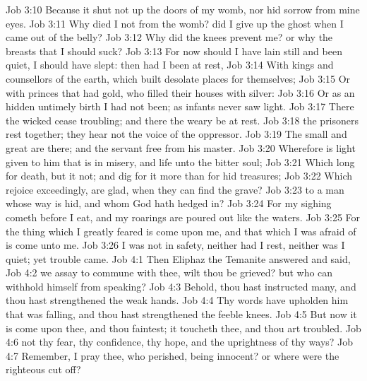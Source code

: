 \vs Job 3:10 Because it shut not up the doors of my  womb, nor hid sorrow from mine eyes.
\vs Job 3:11 Why died I not from the womb?  did I  give up the ghost when I came out of the belly?
\vs Job 3:12 Why did the knees prevent me? or why the breasts that I should suck?
\vs Job 3:13 For now should I have lain still and been quiet, I should have slept: then had I been at rest,
\vs Job 3:14 With kings and counsellors of the earth, which built desolate places for themselves;
\vs Job 3:15 Or with princes that had gold, who filled their houses with silver:
\vs Job 3:16 Or as an hidden untimely birth I had not been; as infants  never saw light.
\vs Job 3:17 There the wicked cease  troubling; and there the weary be at rest.
\vs Job 3:18  the prisoners rest together; they hear not the voice of the oppressor.
\vs Job 3:19 The small and great are there; and the servant  free from his master.
\vs Job 3:20 Wherefore is light given to him that is in misery, and life unto the bitter  soul;
\vs Job 3:21 Which long for death, but it  not; and dig for it more than for hid treasures;
\vs Job 3:22 Which rejoice exceedingly,  are glad, when they can find the grave?
\vs Job 3:23  to a man whose way is hid, and whom God hath hedged in?
\vs Job 3:24 For my sighing cometh before I eat, and my roarings are poured out like the waters.
\vs Job 3:25 For the thing which I greatly feared is come upon me, and that which I was afraid of is come unto me.
\vs Job 3:26 I was not in safety, neither had I rest, neither was I quiet; yet trouble came.
\vs Job 4:1 Then Eliphaz the Temanite answered and said,
\vs Job 4:2  we assay to commune with thee, wilt thou be grieved? but who can withhold himself from speaking?
\vs Job 4:3 Behold, thou hast instructed many, and thou hast strengthened the weak hands.
\vs Job 4:4 Thy words have upholden him that was falling, and thou hast strengthened the feeble knees.
\vs Job 4:5 But now it is come upon thee, and thou faintest; it toucheth thee, and thou art troubled.
\vs Job 4:6  not  thy fear, thy confidence, thy hope, and the uprightness of thy ways?
\vs Job 4:7 Remember, I pray thee, who  perished, being innocent? or where were the righteous cut off?

